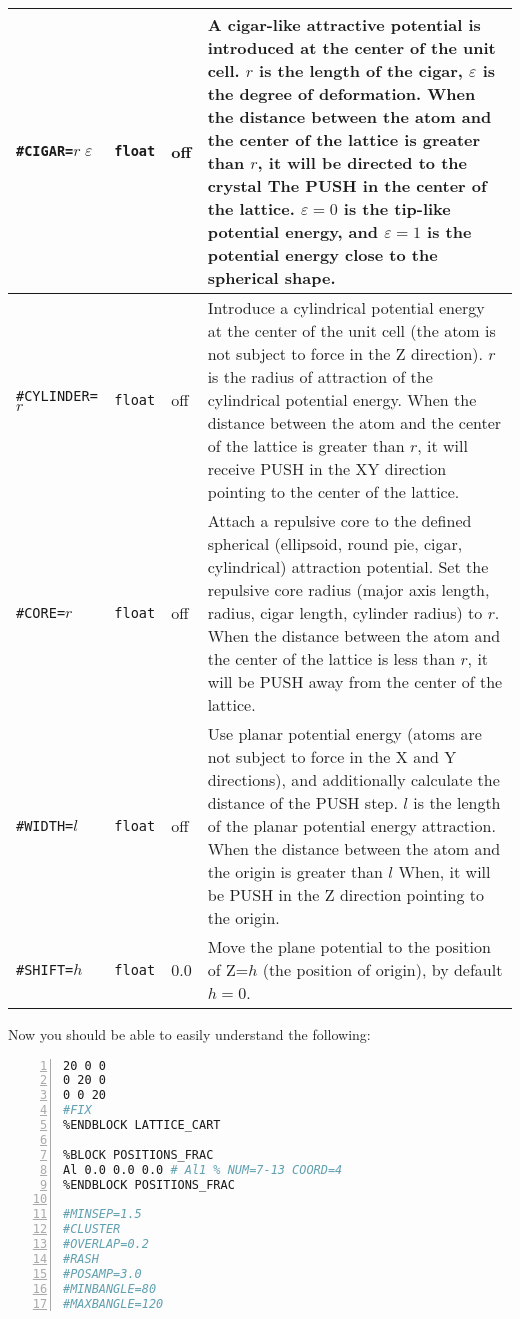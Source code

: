 \documentclass[a4paper, 10pt]{article}
\begin{document}
\begin{center}
\begin{longtable}{m{11em}|m{4em}<{\centering}|m{3em}<{\centering}|m{15em}}
\midrule
\verb|#CIGAR=|\(r\;\varepsilon\) & \verb|float| & off & A cigar-like attractive potential is introduced at the center of the unit cell. \(r\) is the length of the cigar, \(\varepsilon\) is the degree of deformation. When the distance between the atom and the center of the lattice is greater than \(r\), it will be directed to the crystal The PUSH in the center of the lattice. \(\varepsilon=0\) is the tip-like potential energy, and \(\varepsilon=1\) is the potential energy close to the spherical shape.\\
\midrule
\verb|#CYLINDER=|\(r\) & \verb|float| & off & Introduce a cylindrical potential energy at the center of the unit cell (the atom is not subject to force in the Z direction). \(r\) is the radius of attraction of the cylindrical potential energy. When the distance between the atom and the center of the lattice is greater than \(r\), it will receive PUSH in the XY direction pointing to the center of the lattice.\\
\midrule
\verb|#CORE=|\(r\) & \verb|float| & off & Attach a repulsive core to the defined spherical (ellipsoid, round pie, cigar, cylindrical) attraction potential. Set the repulsive core radius (major axis length, radius, cigar length, cylinder radius) to \(r\). When the distance between the atom and the center of the lattice is less than \(r\), it will be PUSH away from the center of the lattice.\\
\midrule
\verb|#WIDTH=|\(l\)& \verb|float| & off & Use planar potential energy (atoms are not subject to force in the X and Y directions), and additionally calculate the distance of the PUSH step. \(l\) is the length of the planar potential energy attraction. When the distance between the atom and the origin is greater than \(l\) When, it will be PUSH in the Z direction pointing to the origin.\\
\midrule
\verb|#SHIFT=|\(h\)& \verb|float|& 0.0  & Move the plane potential to the position of Z=\(h\) (the position of origin), by default \(h=0\).\\
\bottomrule
\end{longtable}
\end{center}

\newpage
Now you should be able to easily understand the following:

\begin{lstlisting}[language={bash},numbers=left]
%BLOCK LATTICE_CART
20 0 0
0 20 0
0 0 20
#FIX
%ENDBLOCK LATTICE_CART

%BLOCK POSITIONS_FRAC
Al 0.0 0.0 0.0 # Al1 % NUM=7-13 COORD=4
%ENDBLOCK POSITIONS_FRAC

#MINSEP=1.5
#CLUSTER
#OVERLAP=0.2
#RASH
#POSAMP=3.0
#MINBANGLE=80
#MAXBANGLE=120
\end{lstlisting}
\end{document}
